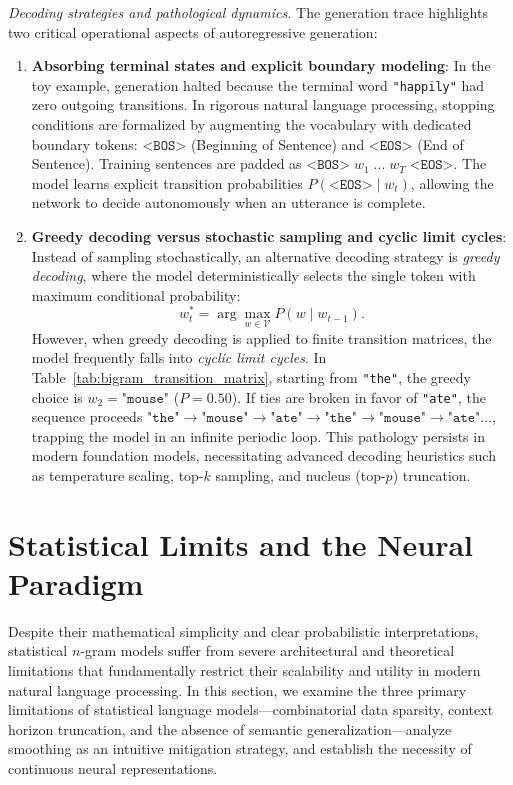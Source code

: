 \documentclass[../../../main.tex]{subfiles}
\begin{document}
\textit{Decoding strategies and pathological dynamics.} The generation trace highlights two critical operational aspects of autoregressive generation:
\begin{enumerate}
    \item \textbf{Absorbing terminal states and explicit boundary modeling}: In the toy example, generation halted because the terminal word \texttt{"happily"} had zero outgoing transitions. In rigorous natural language processing, stopping conditions are formalized by augmenting the vocabulary with dedicated boundary tokens: $\texttt{<BOS>}$ (Beginning of Sentence) and $\texttt{<EOS>}$ (End of Sentence). Training sentences are padded as $\texttt{<BOS>} \; w_1 \; \dots \; w_T \; \texttt{<EOS>}$. The model learns explicit transition probabilities $P(\texttt{<EOS>} \mid w_t)$, allowing the network to decide autonomously when an utterance is complete.
    \item \textbf{Greedy decoding versus stochastic sampling and cyclic limit cycles}: Instead of sampling stochastically, an alternative decoding strategy is \textit{greedy decoding}, where the model deterministically selects the single token with maximum conditional probability:
    \begin{equation}
    w_t^* = \arg\max_{w \in \mathcal{V}} P\left(w \mid w_{t-1}\right).
    \label{eq:greedy_decoding}
    \end{equation}
    However, when greedy decoding is applied to finite transition matrices, the model frequently falls into \textit{cyclic limit cycles}. In Table~\ref{tab:bigram_transition_matrix}, starting from \texttt{"the"}, the greedy choice is $w_2 = \texttt{"mouse"}$ ($P = 0.50$). If ties are broken in favor of \texttt{"ate"}, the sequence proceeds $\texttt{"the"} \to \texttt{"mouse"} \to \texttt{"ate"} \to \texttt{"the"} \to \texttt{"mouse"} \to \texttt{"ate"} \dots$, trapping the model in an infinite periodic loop. This pathology persists in modern foundation models, necessitating advanced decoding heuristics such as temperature scaling, top-$k$ sampling, and nucleus (top-$p$) truncation.
\end{enumerate}

\clearpage
\section{Statistical Limits and the Neural Paradigm}
\label{sec:statistical_lm_limitations}

Despite their mathematical simplicity and clear probabilistic interpretations, statistical $n$-gram models suffer from severe architectural and theoretical limitations that fundamentally restrict their scalability and utility in modern natural language processing. In this section, we examine the three primary limitations of statistical language models---combinatorial data sparsity, context horizon truncation, and the absence of semantic generalization---analyze smoothing as an intuitive mitigation strategy, and establish the necessity of continuous neural representations.
\end{document}
